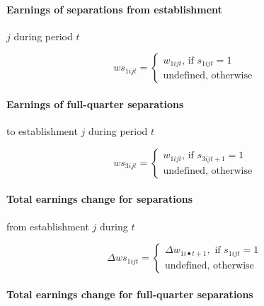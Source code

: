\paragraph{Earnings of separations from establishment}

 

$j$ during period $t$

\begin{equation}
ws_{1ijt} = \left\{ 
\begin{array}{l}
{w_{1ijt} \mbox{, if }s_{1ijt} = 1} \\ 
{\mbox{undefined, otherwise}}%
\end{array}%
\right.
\end{equation}

\paragraph{Earnings of full-quarter separations}

to establishment $j$ during period $t$

\begin{equation}
ws_{3ijt} = \left\{ 
\begin{array}{l}
{w_{1ijt} \mbox{, if }s_{3ijt + 1} = 1} \\ 
{\mbox{undefined, otherwise}}%
\end{array}%
\right.
\end{equation}

\paragraph{Total earnings change for separations}

 

from establishment $j$ during $t$

\begin{equation}
\Delta ws_{1ijt} = \left\{ 
\begin{array}{l}
{\Delta w_{1i\bullet t + 1} ,\mbox{ if }s_{1ijt} = 1} \\ 
{\mbox{undefined, otherwise}}%
\end{array}
\right.
\end{equation}

\paragraph{Total earnings change for full-quarter separations}

